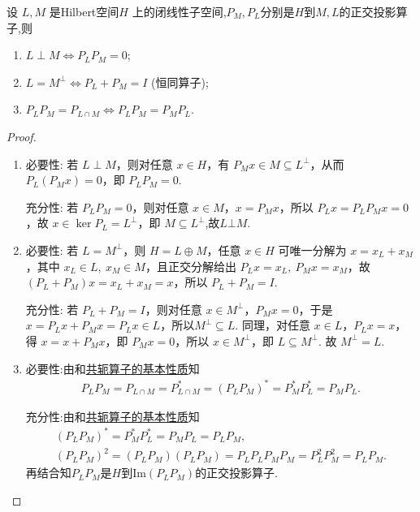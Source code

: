 \documentclass[../../main.tex]{subfiles}%
\begin{document}
\begin{proposition}
设 $L, M$ 是Hilbert空间$H$ 上的闭线性子空间,$P_M,P_L$分别是$H$到$M,L$的正交投影算子,则
\begin{enumerate}[(1)]
\item $L \perp M \iff P_L P_M = 0$;
\item $L = M^\perp \iff P_L + P_M = I$ (恒同算子);
\item $P_L P_M = P_{L \cap M} \iff P_L P_M = P_M P_L$.
\end{enumerate}
\end{proposition}
\begin{proof}
\begin{enumerate}[(1)]
\item {\heiti 必要性:} 若 $L\perp M$，则对任意 $x\in H$，有 $P_M x\in M\subseteq L^\perp$，从而 $P_L(P_M x)=0$，即 $P_LP_M=0$.

{\heiti 充分性:} 若 $P_LP_M=0$，则对任意 $x\in M$，$x=P_Mx$，所以 $P_L x=P_LP_Mx=0$，故 $x\in \ker P_L = L^\perp$，即 $M\subseteq L^\perp$,故$L\bot M.$

\item {\heiti 必要性:} 若 $L=M^\perp$，则 $H=L\oplus M$，任意 $x\in H$ 可唯一分解为 $x=x_L+x_M$，其中 $x_L\in L,\ x_M\in M$，且正交分解给出 $P_Lx=x_L,\ P_Mx=x_M$，故 $(P_L+P_M)x=x_L+x_M=x$，所以 $P_L+P_M=I$.

{\heiti 充分性:} 若 $P_L+P_M=I$，则对任意 $x\in M^\bot$，$P_Mx=0$，于是 $x=P_Lx+P_Mx=P_Lx\in L$，所以$M^\bot \subseteq L$. 同理，对任意 $x\in L$，$P_Lx=x$，得 $x=x+P_Mx$，即 $P_Mx=0$，所以 $x\in M^\perp$，即 $L\subseteq M^\perp$. 故 $M^\perp=L$.

\item {\heiti 必要性:}由和\hyperref[proposition:共轭算子的基本性质]{共轭算子的基本性质}知
\begin{align*}
P_LP_M=P_{L\cap M}=P_{L\cap M}^{*}=\left( P_LP_M \right) ^*=P_{M}^{*}P_{L}^{*}=P_MP_L.
\end{align*}

{\heiti 充分性:}由和\hyperref[proposition:共轭算子的基本性质]{共轭算子的基本性质}知
\begin{gather*}
\left( P_LP_M \right) ^*=P_{M}^{*}P_{L}^{*}=P_MP_L=P_LP_M,
\\
\left( P_LP_M \right) ^2=\left( P_LP_M \right) \left( P_LP_M \right) =P_LP_LP_MP_M=P_{L}^{2}P_{M}^{2}=P_LP_M.
\end{gather*}
再结合知$P_L P_M$是$H$到$\text{Im}(P_L P_M)$的正交投影算子.


\end{enumerate}
\end{proof}
\end{document}
